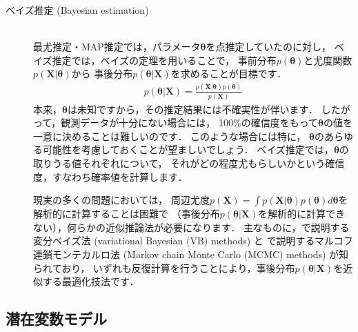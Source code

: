 \begin{description}
\item[ベイズ推定 (Bayesian estimation)] \ \\
最尤推定・MAP推定では，パラメータ$\bm\theta$を点推定していたのに対し，
ベイズ推定では，ベイズの定理を用いることで，
事前分布$p(\bm\theta)$と尤度関数$p(\bm{X}|\bm\theta)$から
事後分布$p(\bm\theta|\bm{X})$を求めることが目標です．
\begin{align}
 p(\bm\theta|\bm{X}) = \frac{p(\bm{X}|\bm\theta)p(\bm\theta)}{p(\bm{X})}
\end{align}
本来，$\bm\theta$は未知ですから，その推定結果には不確実性が伴います．
したがって，観測データが十分にない場合には，
100\%の確信度をもって$\bm\theta$の値を一意に決めることは難しいのです．
このような場合には特に，
$\bm\theta$のあらゆる可能性を考慮しておくことが望ましいでしょう．
ベイズ推定では，$\bm\theta$の取りうる値それぞれについて，
それがどの程度尤もらしいかという確信度，すなわち確率値を計算します．

現実の多くの問題においては，
周辺尤度$p(\bm{X})=\int p(\bm{X}|\bm\theta) p(\bm\theta) d\bm\theta$を解析的に計算することは困難で
（事後分布$p(\bm\theta|\bm{X})$を解析的に計算できない），何らかの近似推論法が必要になります．
主なものに，で説明する変分ベイズ法 (variational Bayesian (VB) methods) と
で説明するマルコフ連鎖モンテカルロ法 (Markov chain Monte Carlo (MCMC) methods) が知られており，
いずれも反復計算を行うことにより，事後分布$p(\bm\theta|\bm{X})$を近似する最適化技法です．
\end{description}

\subsection{潜在変数モデル}

